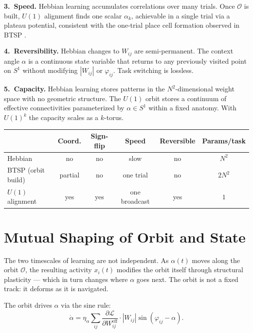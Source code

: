 \documentclass[11pt]{article}
\begin{document}
\textbf{3.~Speed.} Hebbian learning accumulates correlations over
many trials. Once $\mathcal{O}$ is built, $U(1)$ alignment finds one
scalar $\alpha_k$, achievable in a single trial via a plateau
potential, consistent with the one-trial place cell formation
observed in BTSP \citep{magee2026}.

\textbf{4.~Reversibility.} Hebbian changes to $W_{ij}$ are
semi-permanent. The context angle $\alpha$ is a continuous state
variable that returns to any previously visited point on $S^1$
without modifying $|W_{ij}|$ or $\varphi_{ij}$. Task switching
is lossless.

\textbf{5.~Capacity.} Hebbian learning stores patterns in the
$N^2$-dimensional weight space with no geometric structure.
The $U(1)$ orbit stores a continuum of effective connectivities
parameterized by $\alpha \in S^1$ within a fixed anatomy. With
$U(1)^k$ the capacity scales as a $k$-torus.

\begin{center}
\renewcommand{\arraystretch}{1.3}
\begin{tabular}{@{}lccccc@{}}
\toprule
& \textbf{Coord.} & \textbf{Sign-flip} & \textbf{Speed} &
  \textbf{Reversible} & \textbf{Params/task} \\
\midrule
Hebbian & no & no & slow & no & $N^2$ \\
BTSP (orbit build) & partial & no & one trial & no & $2N^2$ \\
$U(1)$ alignment & yes & yes & one broadcast & yes & $1$ \\
\bottomrule
\end{tabular}
\end{center}

\section{Mutual Shaping of Orbit and State}

The two timescales of learning are not independent. As $\alpha(t)$
moves along the orbit $\mathcal{O}$, the resulting activity
$x_i(t)$ modifies the orbit itself through structural plasticity ---
which in turn changes where $\alpha$ goes next. The orbit is not
a fixed track: it deforms as it is navigated.

The orbit drives $\alpha$ via the sine rule:
\begin{equation}
\dot{\alpha} = \eta_\alpha \sum_{ij}
\frac{\partial \mathcal{L}}{\partial W_{ij}^{\text{eff}}} \cdot
|W_{ij}|\sin(\varphi_{ij} - \alpha).
\label{eq:alpha_dynamics}
\end{equation}
\end{document}
